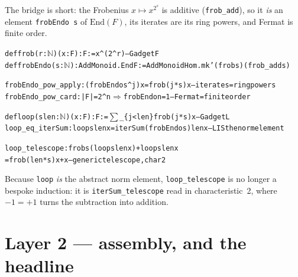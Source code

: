 \documentclass[11pt]{article}
\newenvironment{lean}{\begin{leanbox}\begin{alltt}\small}{\end{alltt}\end{leanbox}}
\newcommand{\ck}{\textcolor{grn}{\checkmark}}
\newcommand{\lc}[1]{\texttt{\small #1}}
\begin{document}
The bridge is short: the Frobenius $x\mapsto x^{2^{s}}$ is additive
(\lc{frob\_add}), so it \emph{is} an element \lc{frobEndo s} of $\mathrm{End}(F)$,
its iterates are its ring powers, and Fermat is finite order.
\begin{lean}
def frob (r : \(\mathbb{N}\)) (x : F) : F := x ^ (2 ^ r)                         -- Gadget F
def frobEndo (s : \(\mathbb{N}\)) : AddMonoid.End F := AddMonoidHom.mk' (frob s) (frob_add s)

frobEndo_pow_apply : (frobEndo s ^ j) x = frob (j*s) x            \ck  -- iterates = ring powers
frobEndo_pow_card  : |F|=2^n \(\Rightarrow\) frobEndo n = 1                    \ck  -- Fermat = finite order

def loop (s len : \(\mathbb{N}\)) (x : F) : F := \(\sum\)\_\{j<len\} frob (j*s) x            -- Gadget L
loop_eq_iterSum : loop s len x = iterSum (frobEndo s) len x       \ck  -- L IS the norm element

loop_telescope  : frob s (loop s len x) + loop s len x
                    = frob (len*s) x + x                          \ck  -- generic telescope, char 2
\end{lean}
Because \lc{loop} \emph{is} the abstract norm element, \lc{loop\_telescope} is no
longer a bespoke induction: it is \lc{iterSum\_telescope} read in
characteristic~2, where $-1=+1$ turns the subtraction into addition.

\section{Layer 2 --- assembly, and the headline}
\end{document}
